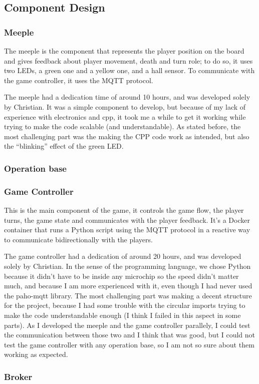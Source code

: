 \documentclass[../main.tex]{subfiles}
\begin{document}
\subsection{Component Design}

\subsubsection{Meeple}

The meeple is the component that represents the player position on the board and gives feedback about player movement, death and turn role; to do so, it uses two LEDs, a green one and a yellow one, and a hall sensor. To communicate with the game controller, it uses the MQTT protocol.

The meeple had a dedication time of around 10 hours, and was developed solely by Christian. It was a simple component to develop, but because of my lack of experience with electronics and cpp, it took me a while to get it working while trying to make the code scalable (and understandable). As stated before, the most challenging part was the making the CPP code work as intended, but also the ``blinking'' effect of the green LED.

\subsubsection{Operation base}

\subsubsection{Game Controller}

This is the main component of the game, it controls the game flow, the player turns, the game state and communicates with the player feedback. It's a Docker container that runs a Python script using the MQTT protocol in a reactive way to communicate bidirectionally with the players. 

The game controller had a dedication of around 20 hours, and was developed solely by Christian. In the sense of the programming language, we chose Python because it didn't have to be inside any microchip so the speed didn't matter much, and because I am more experienced with it, even though I had never used the paho-mqtt library. The most challenging part was making a decent structure for the project, because I had some trouble with the circular imports trying to make the code understandable enough (I think I failed in this aspect in some parts). As I developed the meeple and the game controller parallely, I could test the communication between those two and I think that was good, but I could not test the game controller with any operation base, so I am not so sure about them working as expected. 

\subsubsection{Broker}
\end{document}
